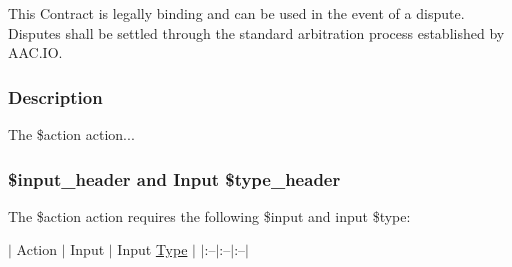 This Contract is legally binding and can be used in the event of a dispute. Disputes shall be settled through the standard arbitration process established by A\+A\+C.\+IO.

\subsubsection*{Description}

The {\ttfamily \$action} action...

\subsubsection*{\$input\+\_\+header and Input \$type\+\_\+header}

The {\ttfamily \$action} action requires the following {\ttfamily \$input} and {\ttfamily input \$type}\+:

$\vert$ Action $\vert$ Input $\vert$ Input \mbox{\hyperlink{struct_type}{Type}} $\vert$ $\vert$\+:--$\vert$\+:--$\vert$\+:--$\vert$ 